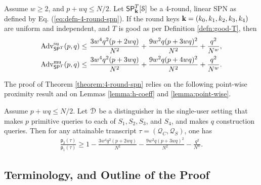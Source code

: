 \begin{theorem}
\label{theorem:4-round-spn}

Assume $w\geq2$, and $p+wq\leq N/2$. Let $\mathsf{SP}_{\mathbf{k}}^T[\mathcal{S}]$ be a 4-round, linear SPN as defined by Eq. (\ref{eq:defn-4-round-spn}). If the round keys $\mathbf{k}=(k_0,k_1,k_2,k_3,k_4)$ are uniform and independent, and $T$ is good as per Definition \ref{defn:good-T}, then
%
\begin{align}
\operatorname{Adv}_{\mathsf{SP}^T}^{\mathrm{su}}(p, q) \leq~& 	\frac{3w^4q^2(p+2wq)}{N^2}+\frac{9w^2q(p+3wq)^2}{N^2}+\frac{q^2}{N^w},   
\notag   \\
\operatorname{Adv}_{\mathsf{SP}^T}^{\mathrm{mu}}(p, q) \leq~& \frac{3w^4q^2(p+3wq)}{N^2}+\frac{9w^2q(p+4wq)^2}{N^2}+\frac{q^2}{N^w}.
\notag
\end{align}
\end{theorem}
The proof of Theorem \ref{theorem:4-round-spn} relies on the following point-wise proximity result and on Lemmas \ref{lemma:h-coeff} and \ref{lemma:point-wise}.


\begin{lemma}
	\label{lemma:proximity-4-round}
	
	Assume $p+wq\leq N/2$. Let $\mathcal{D}$ be a distinguisher in the single-user setting that makes $p$ primitive queries to each of $S_1,S_2,S_3$, and $S_4$, and makes $q$ construction queries. Then for any attainable
	transcript $\tau=(\mathcal{Q}_C,\mathcal{Q}_S)$, one has
	\begin{align}
	\frac{\mathsf{p}_{2}(\tau)}{\mathsf{p}_{1}(\tau)}
	\geq 1-
	\frac{3w^4q^2(p+2wq)}{N^2}-\frac{9w^2q(p+3wq)^2}{N^2}-\frac{q^2}{N^w}.
	\label{eq:bound-proximity-4-round}
	\end{align}
\end{lemma}




\subsection{Terminology, and Outline of the Proof}
\label{sec:proof-sketch-4-rounds}

